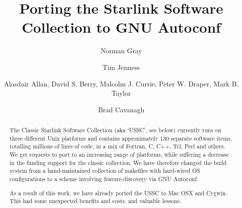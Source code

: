 \documentclass[11pt,twoside]{article}
\begin{document}

\title{Porting the Starlink Software Collection to GNU Autoconf}
\marginpar{[v\RCSRevision]}

\author{Norman Gray}
\author{Tim Jenness}
\author{Alasdair Allan,
        David S. Berry,
        Malcolm J. Currie,
        Peter W. Draper,
        Mark B. Taylor}
\author{Brad Cavanagh}







\begin{abstract}

The Classic Starlink Software Collection (aka `USSC', see below)
currently runs on three different Unix platforms and contains
approximately 130 separate software items, totalling millions of lines
of code, in a mix of Fortran, C, C++, Tcl, Perl and others.  We get requests
to port to an increasing range of platforms, while suffering a
decrease in the funding support for the classic collection.  We have
therefore changed the build system from a hand-maintained collection
of makefiles with hard-wired OS configurations to a scheme involving
feature-discovery via GNU Autoconf.

As a result of this work, we have already ported the USSC to Mac OSX
and Cygwin.  This had some unexpected benefits and costs, and
valuable lessons.
\end{abstract}
\end{document}
